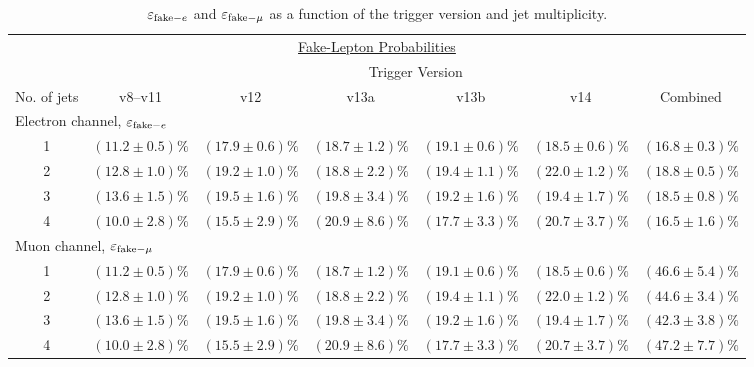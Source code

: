 \vspace{0.2in}
\begin{table}[!h!tbp]
\begin{center}
\begin{minipage}{6 in}
\begin{ruledtabular}
\begin{tabular}{c||ccccc|c}
\multicolumn{7}{c}{\hspace{1in}\underline{Fake-Lepton Probabilities}}
\vspace{0.1in}\\
& \multicolumn{6}{c}{Trigger Version}\\
No. of jets & v8--v11 & v12 & v13a & v13b & v14 & Combined\\
\hline 
\multicolumn{7}{l}{Electron channel, $\varepsilon_{{\rm fake-}e}$} \\
 1 & $(11.2 \pm 0.5)\%$ & $(17.9 \pm 0.6)\%$ & $(18.7 \pm 1.2)\%$ & $(19.1 \pm 0.6)\%$ & $(18.5 \pm 0.6)\%$ & $(16.8 \pm 0.3)\%$ \\
 2 & $(12.8 \pm 1.0)\%$ & $(19.2 \pm 1.0)\%$ & $(18.8 \pm 2.2)\%$ & $(19.4 \pm 1.1)\%$ & $(22.0 \pm 1.2)\%$ & $(18.8 \pm 0.5)\%$ \\
 3 & $(13.6 \pm 1.5)\%$ & $(19.5 \pm 1.6)\%$ & $(19.8 \pm 3.4)\%$ & $(19.2 \pm 1.6)\%$ & $(19.4 \pm 1.7)\%$ & $(18.5 \pm 0.8)\%$ \\
 4 & $(10.0 \pm 2.8)\%$ & $(15.5 \pm 2.9)\%$ & $(20.9 \pm 8.6)\%$ & $(17.7 \pm 3.3)\%$ & $(20.7 \pm 3.7)\%$ & $(16.5 \pm 1.6)\%$ \\
\multicolumn{7}{l}{Muon channel, $\varepsilon_{{\rm fake-}\mu}$} \\
 1 & $(11.2 \pm 0.5)\%$ & $(17.9 \pm 0.6)\%$ & $(18.7 \pm 1.2)\%$ & $(19.1 \pm 0.6)\%$ & $(18.5 \pm 0.6)\%$ & $(46.6 \pm 5.4)\%$ \\
 2 & $(12.8 \pm 1.0)\%$ & $(19.2 \pm 1.0)\%$ & $(18.8 \pm 2.2)\%$ & $(19.4 \pm 1.1)\%$ & $(22.0 \pm 1.2)\%$ & $(44.6 \pm 3.4)\%$ \\
 3 & $(13.6 \pm 1.5)\%$ & $(19.5 \pm 1.6)\%$ & $(19.8 \pm 3.4)\%$ & $(19.2 \pm 1.6)\%$ & $(19.4 \pm 1.7)\%$ & $(42.3 \pm 3.8)\%$ \\
 4 & $(10.0 \pm 2.8)\%$ & $(15.5 \pm 2.9)\%$ & $(20.9 \pm 8.6)\%$ & $(17.7 \pm 3.3)\%$ & $(20.7 \pm 3.7)\%$ & $(47.2 \pm 7.7)\%$
\end{tabular}
\end{ruledtabular}
\vspace{-0.1in}
\caption[epsqcd]{$\varepsilon_{{\rm fake-}e}$ and
$\varepsilon_{{\rm fake-}\mu}$ as a function of the trigger version
and jet multiplicity.}
\label{eps-qcd}
\end{minipage}
\end{center}
\end{table}


